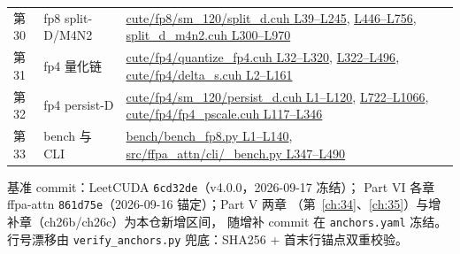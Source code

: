 \begin{longtable}{llp{7.2cm}}
第30 & fp8 split-D/M4N2 & \href{https://github.com/xlite-dev/ffpa-attn/blob/861d75ee87824a14a9ebfe295d54c7dac3e3cabc/csrc/cuffpa/cute/fp8/sm_120/split_d.cuh#L39-L245}{cute/fp8/sm\_120/split\_d.cuh L39--L245}, \href{https://github.com/xlite-dev/ffpa-attn/blob/861d75ee87824a14a9ebfe295d54c7dac3e3cabc/csrc/cuffpa/cute/fp8/sm_120/split_d.cuh#L446-L756}{L446--L756}, \href{https://github.com/xlite-dev/ffpa-attn/blob/861d75ee87824a14a9ebfe295d54c7dac3e3cabc/csrc/cuffpa/cute/fp8/sm_120/split_d_m4n2.cuh#L300-L970}{split\_d\_m4n2.cuh L300--L970} \\
第31 & fp4 量化链 & \href{https://github.com/xlite-dev/ffpa-attn/blob/861d75ee87824a14a9ebfe295d54c7dac3e3cabc/csrc/cuffpa/cute/fp4/quantize_fp4.cuh#L32-L320}{cute/fp4/quantize\_fp4.cuh L32--L320}, \href{https://github.com/xlite-dev/ffpa-attn/blob/861d75ee87824a14a9ebfe295d54c7dac3e3cabc/csrc/cuffpa/cute/fp4/quantize_fp4.cuh#L322-L496}{L322--L496}, \href{https://github.com/xlite-dev/ffpa-attn/blob/861d75ee87824a14a9ebfe295d54c7dac3e3cabc/csrc/cuffpa/cute/fp4/delta_s.cuh#L2-L161}{cute/fp4/delta\_s.cuh L2--L161} \\
第32 & fp4 persist-D & \href{https://github.com/xlite-dev/ffpa-attn/blob/861d75ee87824a14a9ebfe295d54c7dac3e3cabc/csrc/cuffpa/cute/fp4/sm_120/persist_d.cuh#L1-L120}{cute/fp4/sm\_120/persist\_d.cuh L1--L120}, \href{https://github.com/xlite-dev/ffpa-attn/blob/861d75ee87824a14a9ebfe295d54c7dac3e3cabc/csrc/cuffpa/cute/fp4/sm_120/persist_d.cuh#L722-L1066}{L722--L1066}, \href{https://github.com/xlite-dev/ffpa-attn/blob/861d75ee87824a14a9ebfe295d54c7dac3e3cabc/csrc/cuffpa/cute/fp4/fp4_pscale.cuh#L117-L346}{cute/fp4/fp4\_pscale.cuh L117--L346} \\
第33 & bench 与 CLI & \href{https://github.com/xlite-dev/ffpa-attn/blob/861d75ee87824a14a9ebfe295d54c7dac3e3cabc/bench/bench_fp8.py#L1-L140}{bench/bench\_fp8.py L1--L140}, \href{https://github.com/xlite-dev/ffpa-attn/blob/861d75ee87824a14a9ebfe295d54c7dac3e3cabc/src/ffpa_attn/cli/_bench.py#L347-L490}{src/ffpa\_attn/cli/\_bench.py L347--L490} \\
\bottomrule
\end{longtable}

基准 commit：LeetCUDA \texttt{6cd32de}（v4.0.0，2026-09-17 冻结）；
Part VI 各章 ffpa-attn \texttt{861d75e}（2026-09-16 锚定）；Part V 两章
（第~\ref{ch:34}、\ref{ch:35}）与增补章（ch26b/ch26c）为本仓新增区间，
随增补 commit 在 \texttt{anchors.yaml} 冻结。行号漂移由
\texttt{verify\_\allowbreak{}anchors.\allowbreak{}py} 兜底：SHA256 + 首末行锚点双重校验。
